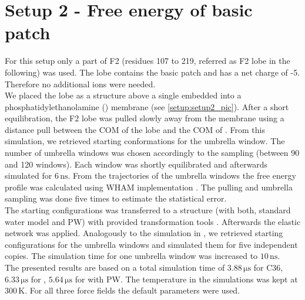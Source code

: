 \section{Setup 2 - Free energy of basic patch}
\label{setup:setup2}
For this setup only a part of F2 (residues 107 to 219, referred as F2 lobe in the following) was used. The lobe contains the basic patch and has a net charge of -5. Therefore no additional ions were needed.\\
We placed the lobe as a \charmm{} structure above a single \pip{} embedded into a phosphatidylethanolamine (\pope{}) membrane (see \autoref{setup:setup2_pic}). After a short equilibration, the F2 lobe was pulled slowly away from the membrane using a distance pull between the COM of the lobe and the COM of \pip{}. From this simulation, we retrieved starting conformations for the umbrella window. The number of umbrella windows was chosen accordingly to the sampling (between 90 and 120 windows). Each window was shortly equilibrated and afterwards simulated for $6\,\si{\nano\second}$.  From the trajectories of the umbrella windows the free energy profile was calculated using \gromacs{} WHAM implementation \autocite{gromacsWHAM}. The pulling and umbrella sampling was done five times to estimate the statistical error.\\
The starting configurations was transferred to a \martini{} structure (with both, standard water model and PW) with provided transformation tools \autocite{backward.py}. Afterwards the elastic network was applied. Analogously to the simulation in \charmm{}, we retrieved starting configurations for the umbrella windows and simulated them for five independent copies. The simulation time for one umbrella window was increased to $10\,\si{\nano\second}$.\\
The presented results are based on a total simulation time of $3.88\,\si{\micro\second}$ for C36, $6.33\,\si{\micro\second}$ for \martini{}, $5.64\,\si{\micro\second}$ for \martini{} with PW. The temperature in the simulations was kept at $300\,\si{\kelvin}$. For all three force fields the default parameters were used.
%
%
%
